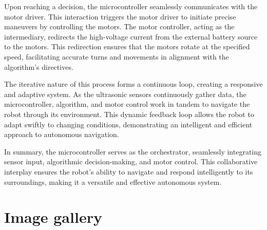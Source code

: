 \documentclass{article}
\begin{document}
    Upon reaching a decision, the microcontroller seamlessly communicates with the motor driver. This interaction triggers the motor driver to initiate precise maneuvers by controlling the motors. The motor controller, acting as the intermediary, redirects the high-voltage current from the external battery source to the motors. This redirection ensures that the motors rotate at the specified speed, facilitating accurate turns and movements in alignment with the algorithm's directives.

    The iterative nature of this process forms a continuous loop, creating a responsive and adaptive system. As the ultrasonic sensors continuously gather data, the microcontroller, algorithm, and motor control work in tandem to navigate the robot through its environment. This dynamic feedback loop allows the robot to adapt swiftly to changing conditions, demonstrating an intelligent and efficient approach to autonomous navigation.

    In summary, the microcontroller serves as the orchestrator, seamlessly integrating sensor input, algorithmic decision-making, and motor control. This collaborative interplay ensures the robot's ability to navigate and respond intelligently to its surroundings, making it a versatile and effective autonomous system.

\section{Image gallery}

\vspace{1cm}
\end{document}
